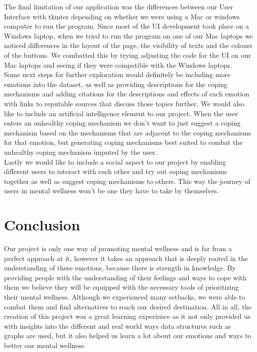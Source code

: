 \documentclass{article}
\begin{document}
    The final limitation of our application was the differences between our User Interface with tkinter depending on whether we were using a Mac or windows computer to run the program. Since most of the UI development took place on a Windows laptop, when we tried to run the program on one of our Mac laptops we noticed differences in the layout of the page, the visibility of texts and the colours of the buttons. We combatted this by trying adjusting the code for the UI on our Mac laptops and seeing if they were compatible with the Windows laptops. \\

    Some next steps for further exploration would definitely be including more emotions into the dataset, as well as providing descriptions for the coping mechanisms and adding citations for the descriptions and effects of each emotion with links to reputable sources that discuss those topics further. We would also like to include an artificial intelligence element to our project. When the user enters an unhealthy coping mechanism we don’t want to just suggest a coping mechanism based on the mechanisms that are adjacent to the coping mechanisms for that emotion, but generating coping mechanisms best suited to combat the unhealthy coping mechanism imputed by the user. \\

    Lastly we would like to include a social aspect to our project by enabling different users to interact with each other and try out coping mechanisms together as well as suggest coping mechanisms to others. This way the journey of users in mental wellness won’t be one they have to take by themselves.\\


    \section{Conclusion}

    Our project is only one way of promoting mental wellness and is far from a perfect approach at it, however it takes an approach that is deeply rooted in the understanding of these emotions, because there is strength in knowledge. By providing people with the understanding of their feelings and ways to cope with them we believe they will be equipped with the necessary tools of prioritizing their mental wellness. Although we experienced many setbacks, we were able to combat them and find alternatives to reach our desired destination. All in all, the creation of this project was a great learning experience as it not only provided us with insights into the different and real world ways data structures such as graphs are used, but it also helped us learn a lot about our emotions and ways to better our mental wellness.
\end{document}
